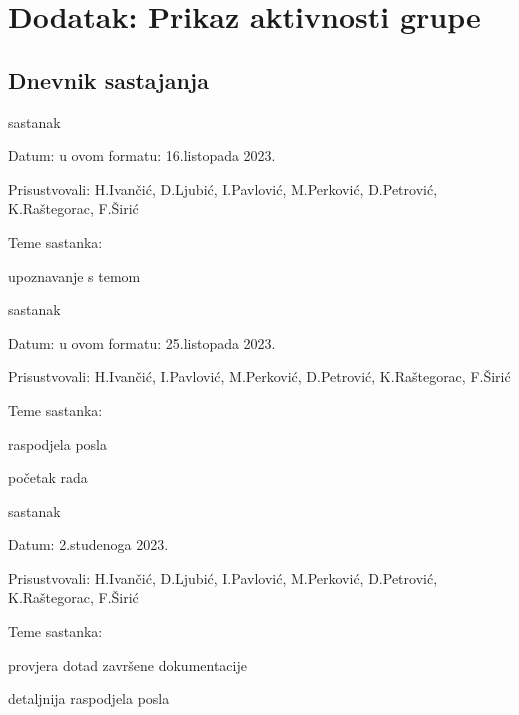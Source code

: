 	\chapter*{Dodatak: Prikaz aktivnosti grupe}
		
		\section*{Dnevnik sastajanja}

		\begin{packed_enum}
			\item  sastanak
			
			\item[] \begin{packed_item}
				\item Datum: u ovom formatu: 16.listopada 2023.
				\item Prisustvovali: H.Ivančić, D.Ljubić, I.Pavlović, M.Perković, D.Petrović, K.Raštegorac, F.Širić
				\item Teme sastanka:
				\begin{packed_item}
					\item  upoznavanje s temom
				\end{packed_item}
			\end{packed_item}
			
			\item  sastanak
			\item[] \begin{packed_item}
				\item Datum: u ovom formatu: 25.listopada 2023.
				\item Prisustvovali: H.Ivančić, I.Pavlović, M.Perković, D.Petrović, K.Raštegorac, F.Širić
				\item Teme sastanka:
				\begin{packed_item}
					\item  raspodjela posla
					\item  početak rada
				\end{packed_item}
			\end{packed_item}
			
			\item  sastanak
			\item[] \begin{packed_item}
				\item Datum: 2.studenoga 2023.
				\item Prisustvovali: H.Ivančić, D.Ljubić, I.Pavlović, M.Perković, D.Petrović, K.Raštegorac, F.Širić
				\item Teme sastanka:
				\begin{packed_item}
					\item  provjera dotad završene dokumentacije
					\item detaljnija raspodjela posla
				\end{packed_item}
			\end{packed_item}
			

\end{packed_enum}
